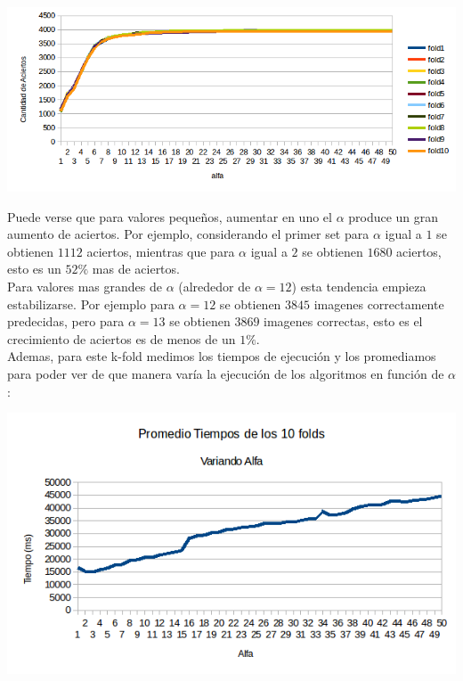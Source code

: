 \begin{center}
\includegraphics[scale=0.6]{nuevosResultados/pca/alfa/1.png}
\end{center}

Puede verse que para valores pequeños, aumentar en uno el $\alpha$ produce un gran aumento de aciertos. Por ejemplo, considerando el primer set para $\alpha$ igual a $1$ se obtienen $1112$ aciertos, mientras que para $\alpha$ igual a $2$ se obtienen $1680$ aciertos, esto es un $52\%$ mas de aciertos.
\\
Para valores mas grandes de $\alpha$ (alrededor de $\alpha = 12$) esta tendencia empieza estabilizarse. Por ejemplo para $\alpha = 12$ se obtienen $3845$ imagenes correctamente predecidas, pero para $\alpha = 13$ se obtienen $3869$ imagenes correctas, esto es el crecimiento de aciertos es de menos de un $1\%$.
\\
Ademas, para este k-fold medimos los tiempos de ejecución y los promediamos para poder ver de que manera varía la ejecución de los algoritmos en función de $\alpha$:

\begin{center}
\includegraphics[scale=0.6]{nuevosResultados/pca/alfa/temp.png}
\end{center}



